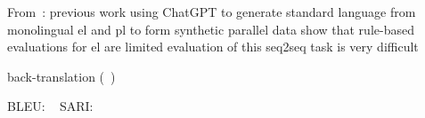 From~\autocite{klöser2024german}:
previous work
using ChatGPT to generate standard language from monolingual \gls{el} and \gls{pl} to form synthetic parallel data
show that rule-based evaluations for \gls{el} are limited
evaluation of this seq2seq task is very difficult

back-translation (~\autocite{sennrich-etal-2016-improving})



BLEU: ~\autocite{papineni-etal-2002-bleu}
SARI: ~\autocite{xu-etal-2016-optimizing}
